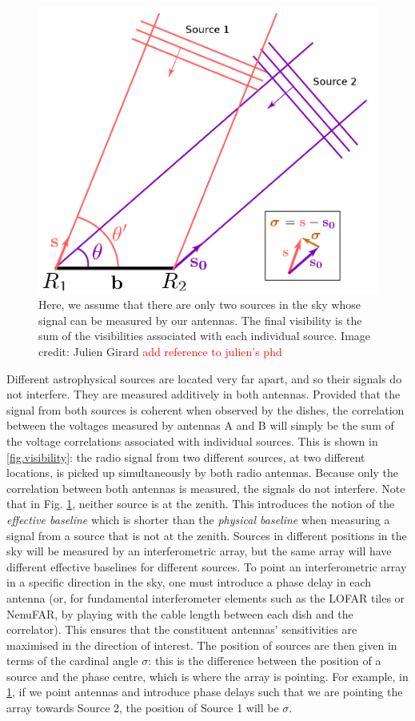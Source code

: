 \begin{figure}[ht]
\centering
\includegraphics[width=.5\textwidth]{images/visibility-measure.png}
\caption{\label{fig.visibility.measure} Here, we assume that there are only two sources in the sky whose signal can be measured by our antennas. The final visibility is the sum of the visibilities associated with each individual source. Image credit: Julien Girard \textcolor{red}{add reference to julien's phd}}
\end{figure}

\pg
Different astrophysical sources are located very far apart, and so their signals do not interfere. They are measured additively in both antennas. Provided that the signal from both sources is coherent when observed by the dishes, the correlation between the voltages measured by antennas A and B will simply be the sum of the voltage correlations associated with individual sources. This is shown in \cref{fig.visibility}: the radio signal from two different sources, at two different locations, is picked up simultaneously by both radio antennas. Because only the correlation between both antennas is measured, the signals do not interfere. %
\pg
Note that in Fig. \ref{fig.visibility.measure}, neither source is at the zenith. This introduces the notion of the \emph{effective baseline} which is shorter than the \emph{physical baseline} when measuring a signal from a source that is not at the zenith. Sources in different positions in the sky will be measured by an interferometric array, but the same array will have different effective baselines for different sources. To point an interferometric array in a specific direction in the sky, one must introduce a phase delay in each antenna (or, for fundamental interferometer elements such as the LOFAR tiles or NenuFAR, by playing with the cable length between each dish and the correlator). This ensures that the constituent antennas' sensitivities are maximised in the direction of interest. The position of sources are then given in terms of the cardinal angle $\sigma$: this is the difference between the position of a source and the phase centre, which is where the array is pointing. For example, in \cref{fig.visibility.measure}, if we point antennas and introduce phase delays such that we are pointing the array towards Source 2, the position of Source 1 will be $\sigma$.

